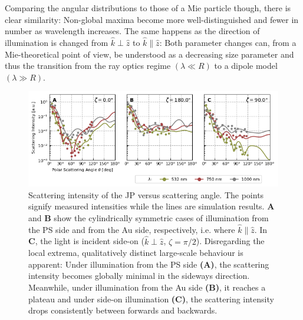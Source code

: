 \documentclass[10pt]{article}
\begin{document}
Comparing the angular distributions to those of a Mie particle though, there is clear similarity: 
Non-global maxima become more well-distinguished and fewer in number as wavelength increases. 
The same happens as the direction of illumination is changed from $\hat{k}\perp\hat{z}$ to $\hat{k}\parallel\hat{z}$: 
Both parameter changes can, from a Mie-theoretical point of view, be understood as a decreasing size parameter and thus the transition from the ray optics regime $\left( \lambda \ll R \right)$ to a dipole model $\left( \lambda \gg R \right)$. 







\begin{figure}[t!]
    \centering
    \includegraphics[width=\textwidth]{[fig] cartesian mieplots (3, placeholder)}
    \caption{Scattering intensity of the JP versus scattering angle. 
    The points signify measured intensities while the lines are simulation results.  
    {\sffamily\bfseries A} and {\sffamily\bfseries B} show the cylindrically symmetric cases of illumination from the PS side and from the Au side, respectively, i.e. where $\hat{k}\parallel\hat{z}$. 
    In {\sffamily\bfseries C}, the light is incident side-on ($\hat{k}\perp\hat{z}$, $\zeta=\pi/2$). 
    Disregarding the local extrema, qualitatively distinct large-scale behaviour is apparent: Under illumination from the PS side {\sffamily\bfseries (A)}, the scattering intensity becomes globally minimal in the sideways direction. 
    Meanwhile, under illumination from the Au side {\sffamily\bfseries (B)}, it reaches a plateau and under side-on illumination {\sffamily\bfseries (C)}, the scattering intensity drops consistently between forwards and backwards.  
    }
    \label{fig:jp-mieplots-oneline}
\end{figure}
\end{document}
